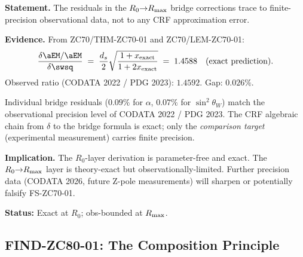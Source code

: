 \documentclass[12pt, a4paper]{article}
\begin{document}
\begin{formalbox}[title={COR-ZC80-01: Bridge Residuals
  Observation-Bounded, Not Theory-Bounded ($R_0{\to}R_{\rm max}$)}]

\textbf{Statement.}
The residuals in the $R_0{\to}R_{\rm max}$ bridge corrections
trace to finite-precision observational data, not to any
CRF approximation error.

\textbf{Evidence.}
From ZC70/THM-ZC70-01 and ZC70/LEM-ZC70-01:
\[
  \frac{\delta\aEM/\aEM}{\delta\swsq}
  \;=\; \frac{d_s}{2}\sqrt{\frac{1+x_{\rm exact}}{1+2x_{\rm exact}}}
  \;=\; 1.4588
  \quad\text{(exact prediction)}.
\]
Observed ratio (CODATA 2022 / PDG 2023): $1.4592$.
Gap: $0.026\%$.

Individual bridge residuals ($0.09\%$ for $\alpha$,
$0.07\%$ for $\sin^2\theta_W$) match the observational
precision level of CODATA 2022 / PDG 2023.
The CRF algebraic chain from $\delta$ to the bridge
formula is exact; only the \emph{comparison target}
(experimental measurement) carries finite precision.

\textbf{Implication.}
The $R_0$-layer derivation is parameter-free and exact.
The $R_0{\to}R_{\rm max}$ layer is theory-exact but
observationally-limited. Further precision data
(CODATA 2026, future Z-pole measurements) will
sharpen or potentially falsify FS-ZC70-01.

\textbf{Status:} Exact at $R_0$; obs-bounded at $R_{\rm max}$.
\end{formalbox}

\subsection{FIND-ZC80-01: The Composition Principle}
\label{sec:find01}
\end{document}
